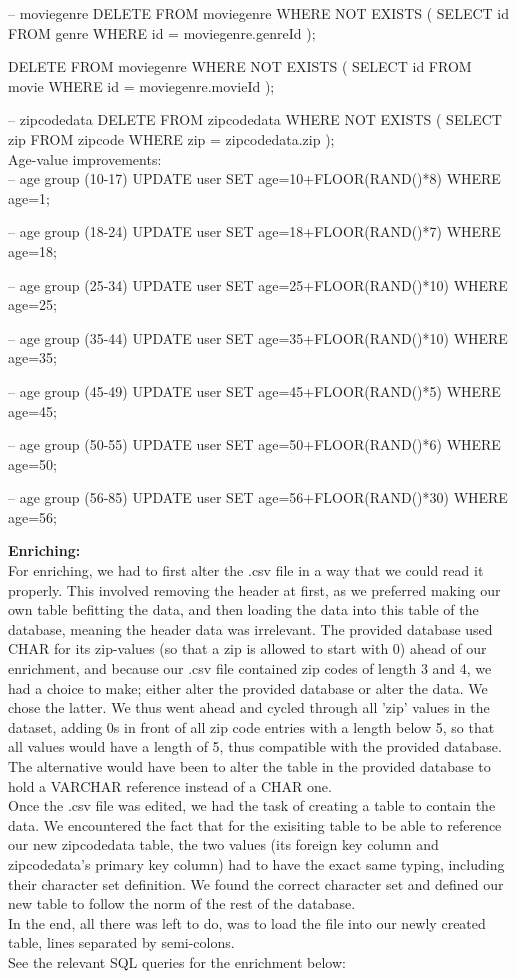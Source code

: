 -- moviegenre
DELETE FROM moviegenre
WHERE NOT EXISTS (
	SELECT id FROM genre
	WHERE id = moviegenre.genreId
);

DELETE FROM moviegenre
WHERE NOT EXISTS (
	SELECT id FROM movie
	WHERE id = moviegenre.movieId
);

-- zipcodedata
DELETE FROM zipcodedata
WHERE NOT EXISTS (
	SELECT zip FROM zipcode
	WHERE zip = zipcodedata.zip
);
\\
Age-value improvements: \\
-- age group (10-17)
UPDATE user
SET age=10+FLOOR(RAND()*8)
WHERE age=1;

-- age group (18-24)
UPDATE user
SET age=18+FLOOR(RAND()*7)
WHERE age=18;

-- age group (25-34)
UPDATE user
SET age=25+FLOOR(RAND()*10)
WHERE age=25;

-- age group (35-44)
UPDATE user
SET age=35+FLOOR(RAND()*10)
WHERE age=35;

-- age group (45-49)
UPDATE user
SET age=45+FLOOR(RAND()*5)
WHERE age=45;

-- age group (50-55)
UPDATE user
SET age=50+FLOOR(RAND()*6)
WHERE age=50;

-- age group (56-85)
UPDATE user
SET age=56+FLOOR(RAND()*30)
WHERE age=56;

\textbf{Enriching:} \\
For enriching, we had to first alter the .csv file in a way that we could read it properly. This involved removing the header at first, as we preferred making our own table befitting the data, and then loading the data into this table of the database, meaning the header data was irrelevant. The provided database used CHAR for its zip-values (so that a zip is allowed to start with 0) ahead of our enrichment, and because our .csv file contained zip codes of length 3 and 4, we had a choice to make; either alter the provided database or alter the data. We chose the latter. We thus went ahead and cycled through all 'zip' values in the dataset, adding 0s in front of all zip code entries with a length below 5, so that all values would have a length of 5, thus compatible with the provided database. The alternative would have been to alter the table in the provided database to hold a VARCHAR reference instead of a CHAR one. \\
Once the .csv file was edited, we had the task of creating a table to contain the data. We encountered the fact that for the exisiting table to be able to reference our new zipcodedata table, the two values (its foreign key column and zipcodedata's primary key column) had to have the exact same typing, including their character set definition. We found the correct character set and defined our new table to follow the norm of the rest of the database. \\
In the end, all there was left to do, was to load the file into our newly created table, lines separated by semi-colons. \\
See the relevant SQL queries for the enrichment below: \\

